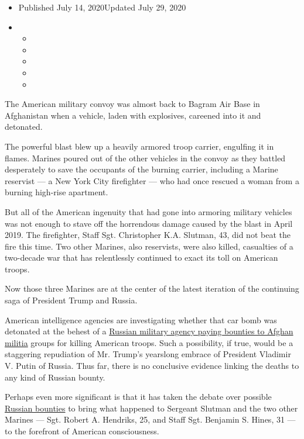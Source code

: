 \begin{itemize}
\item
  Published July 14, 2020Updated July 29, 2020
\item
  \begin{itemize}
  \item
  \item
  \item
  \item
  \item
  \end{itemize}
\end{itemize}

The American military convoy was almost back to Bagram Air Base in
Afghanistan when a vehicle, laden with explosives, careened into it and
detonated.

The powerful blast blew up a heavily armored troop carrier, engulfing it
in flames. Marines poured out of the other vehicles in the convoy as
they battled desperately to save the occupants of the burning carrier,
including a Marine reservist --- a New York City firefighter --- who had
once rescued a woman from a burning high-rise apartment.

But all of the American ingenuity that had gone into armoring military
vehicles was not enough to stave off the horrendous damage caused by the
blast in April 2019. The firefighter, Staff Sgt. Christopher K.A.
Slutman, 43, did not beat the fire this time. Two other Marines, also
reservists, were also killed, casualties of a two-decade war that has
relentlessly continued to exact its toll on American troops.

Now those three Marines are at the center of the latest iteration of the
continuing saga of President Trump and Russia.

American intelligence agencies are investigating whether that car bomb
was detonated at the behest of a
\href{https://www.nytimes.com/2020/06/26/us/politics/russia-afghanistan-bounties.html?searchResultPosition=1}{Russian
military agency paying bounties to Afghan militia} groups for killing
American troops. Such a possibility, if true, would be a staggering
repudiation of Mr. Trump's yearslong embrace of President Vladimir V.
Putin of Russia. Thus far, there is no conclusive evidence linking the
deaths to any kind of Russian bounty.

Perhaps even more significant is that it has taken the debate over
possible
\href{https://www.nytimes.com/2020/07/29/us/politics/trump-putin-bounties.html}{Russian
bounties} to bring what happened to Sergeant Slutman and the two other
Marines --- Sgt. Robert A. Hendriks, 25, and Staff Sgt. Benjamin S.
Hines, 31 --- to the forefront of American consciousness.

